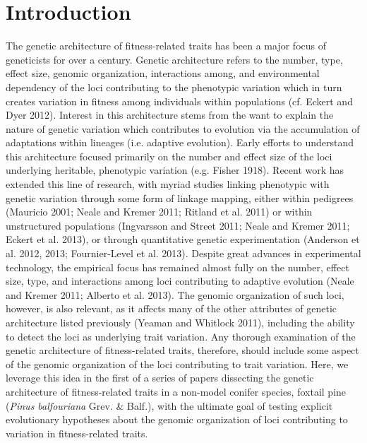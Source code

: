\documentclass[11pt]{article}
\begin{document}
\section{Introduction}
The genetic architecture of fitness-related traits has been a major focus of geneticists for over a century. 
Genetic architecture refers to the number, type, effect size, genomic organization, 
interactions among, and environmental dependency 
of the loci contributing to the phenotypic variation which in turn creates variation in fitness among 
individuals within populations (cf. Eckert and Dyer 2012).
Interest in this architecture stems from the want to explain the nature of 
genetic variation which contributes to evolution 
via the accumulation of adaptations within lineages (i.e. adaptive evolution). Early efforts to understand 
this architecture focused primarily on the number and effect size of the loci underlying heritable, 
phenotypic variation (e.g. Fisher 1918). 
Recent work has extended this line of research, with myriad studies linking 
phenotypic with genetic variation through 
some form of linkage mapping, either within pedigrees (Mauricio 2001; Neale and Kremer 2011; Ritland et al. 2011) 
or within unstructured populations (Ingvarsson and Street 2011; Neale and Kremer 2011; Eckert et al. 2013), or 
through quantitative genetic experimentation (Anderson et al. 2012, 2013; Fournier-Level et al. 2013). 
Despite great advances in experimental technology, the empirical focus has remained almost 
fully on the number, effect size, type, and interactions among loci
contributing to adaptive evolution (Neale and Kremer 2011; Alberto et al. 2013). The genomic organization of such loci, 
however, is also relevant, as 
it affects many of the other attributes of genetic architecture listed previously (Yeaman and Whitlock 2011), 
including the ability to detect the loci as underlying trait variation. 
Any thorough examination of the genetic architecture of fitness-related traits, 
therefore, should include some aspect of the genomic organization of the loci
contributing to trait variation. Here, we leverage this idea in the first of a series of papers 
dissecting the genetic architecture of fitness-related
traits in a non-model conifer species, foxtail pine (\textit{Pinus balfouriana} Grev. \& Balf.), with the ultimate goal of 
testing explicit evolutionary hypotheses about the genomic organization of loci contributing to variation in fitness-related traits.
\end{document}
